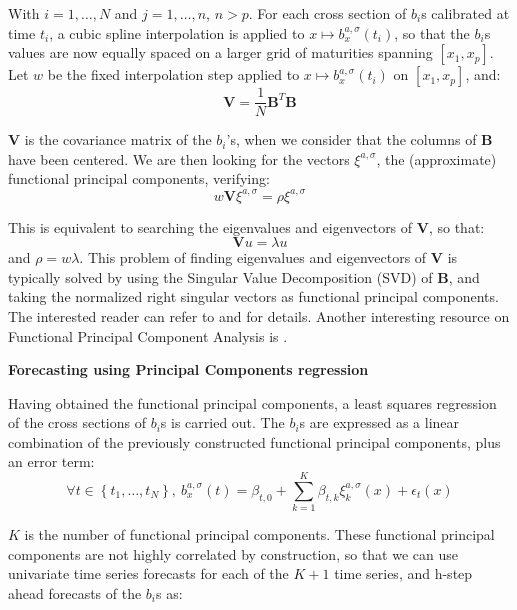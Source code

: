 With $i = 1, \ldots, N$ and $j = 1, \ldots, n$, $n > p$. For each cross section of $b_i$s calibrated at time $t_i$, a cubic spline interpolation is applied to $x \mapsto b^{a, \sigma}_{x}(t_i)$, so that the $b_i$s values are now equally spaced on a larger grid of maturities spanning $\left[ x_1, x_p\right]$. Let $w$ be the fixed interpolation step applied to $x \mapsto b^{a, \sigma}_{x}(t_i)$ on $\left[ x_1, x_p\right]$, and:
\begin{equation}
\textbf{V} = \frac{1}{N}\textbf{B}^T\textbf{B}
\end{equation}

$\textbf{V}$ is the covariance matrix of the $b_i$'s, when we consider that the columns of $\textbf{B}$ have been centered. We are then looking for the vectors $\xi^{a, \sigma}$, the (approximate) functional principal components, verifying:
\begin{equation}
w\textbf{V}\xi^{a, \sigma} = \rho \xi^{a, \sigma}
\end{equation}

This is equivalent to searching the eigenvalues and eigenvectors of $\textbf{V}$, so that:
\begin{equation}
\textbf{V} u = \lambda u
\end{equation}
and $\rho = w \lambda$. This problem of finding eigenvalues and eigenvectors of $\textbf{V}$ is typically solved by using the Singular Value Decomposition (SVD) of \textbf{B}, and taking the normalized right singular vectors as functional principal components. The interested reader can refer to \cite{jolliffe2002principal} and \cite{ramsay2005springer} for details. Another interesting resource on Functional Principal Component Analysis is \cite{shang2014survey}.

\medskip

\textbf{Forecasting using Principal Components regression}

\medskip

Having obtained the functional principal components, a least squares regression of the cross sections of $b_i$s is carried out. The $b_i$s are expressed as a linear combination of the previously constructed functional principal components, plus an error term:
\begin{equation}
\forall t \in \left\lbrace t_1, \ldots, t_N \right\rbrace, \: b^{a, \sigma}_{x}(t) = \beta_{t, 0} + \sum_{k = 1}^K \beta_{t, k} \xi^{a, \sigma}_k(x) + \epsilon_t(x)
\end{equation}

$K$ is the number of functional principal components. These functional principal components are not highly correlated by construction, so that we can use univariate time series forecasts for each of the $K+1$ time series, and h-step ahead forecasts of the $b_i$s as:

